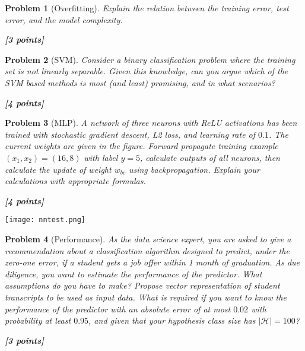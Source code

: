 \documentclass[11pt]{article}
\newtheorem{problem}{Problem}
\newcommand{\point}[1]{\hfill {\bf [#1 points]}}
\newif\ifsolutions
\newcommand{\solution}[1]{
\ifsolutions
\smallskip
\par
\noindent\emph{Solution: } #1
\fi
}
\begin{document}
\begin{problem}[Overfitting]\em
Explain the relation between the training error, test error, and the model complexity. 

\point{3}
\solution{
[Present your solution here...]

}
\end{problem}


\begin{problem} [SVM]\em
Consider a binary classification problem where the training set is not linearly separable. Given this knowledge, can you argue which of the SVM based methods is most (and least) promising, and in what scenarios? 

\point{4} 
\solution{
[Present your solution here...]

}
\end{problem}


\hspace{-0.041\textwidth}
\begin{minipage}{0.55\textwidth}
\begin{problem}[MLP] \em
A network of three neurons with  ReLU activations has been trained with stochastic gradient descent, L2 loss, and learning rate of $0.1$.  The current weights are given in the figure. Forward propagate  training example $(x_1,x_2)=(16,8)$ with label $y=5$, calculate outputs of  all neurons, then  calculate  the update of weight $w_{bc}$ using backpropagation. Explain your calculations with appropriate formulas. 

\point{4}
\end{problem}
\end{minipage}  
\hspace{0.09\textwidth}
\begin{minipage}{0.4\textwidth}
  \texttt{[image: nntest.png]} 
\end{minipage}  

\solution{
[Present your solution here...]

}

\begin{problem}[Performance]\em
As the data science expert, you are asked to give a recommendation about a classification algorithm designed to predict, under the zero-one error, if a student gets a job offer within 1 month of graduation. As due diligence, you want to estimate the performance of the predictor. What assumptions do you have to make? Propose  vector representation of student transcripts to be used as input data. What is required if you want to know the performance of the predictor with an absolute error of at most $0.02$ with probability at least $0.95$, and given that your hypothesis class size has $\mathcal{|H|}=100$? 

\point{3}

\solution{ 

[Present your solution here...]

}
\end{problem}
\end{document}
